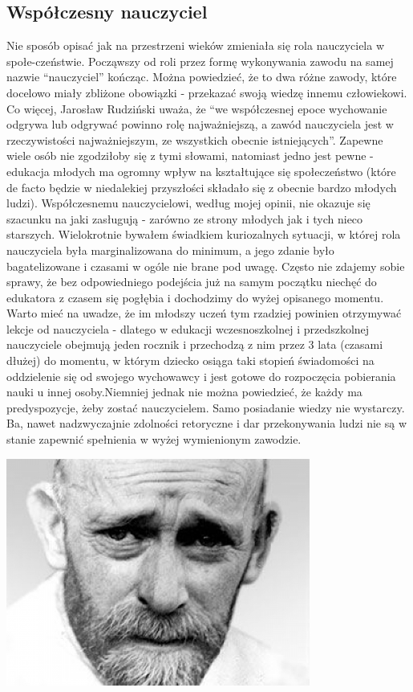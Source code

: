 \documentclass{article}
\begin{document}
\subsection{Współczesny nauczyciel}

Nie sposób opisać jak na przestrzeni wieków zmieniała się rola nauczyciela w społe-czeństwie. Począwszy od roli przez formę wykonywania zawodu na samej nazwie “nauczyciel” kończąc. Można powiedzieć, że to dwa różne zawody, które docelowo miały zbliżone obowiązki - przekazać swoją wiedzę innemu człowiekowi. Co więcej, Jarosław Rudziński uważa, że “we współczesnej epoce wychowanie odgrywa lub odgrywać powinno rolę najważniejszą, a zawód nauczyciela jest w rzeczywistości najważniejszym, ze wszystkich obecnie istniejących”. Zapewne wiele osób nie zgodziłoby się z tymi słowami, natomiast jedno jest pewne - edukacja młodych ma ogromny wpływ na kształtujące się społeczeństwo (które de facto będzie w niedalekiej przyszłości składało się z obecnie bardzo młodych ludzi). Współczesnemu nauczycielowi, według mojej opinii, nie okazuje się szacunku na jaki zasługują - zarówno ze strony młodych jak i tych nieco starszych. Wielokrotnie bywałem świadkiem kuriozalnych sytuacji, w której rola nauczyciela była marginalizowana do minimum, a jego zdanie było bagatelizowane i czasami w ogóle nie brane pod uwagę. Często nie zdajemy sobie sprawy, że bez odpowiedniego podejścia już na samym początku niechęć do edukatora z czasem się pogłębia i dochodzimy do wyżej opisanego momentu. Warto mieć na uwadze, że im młodszy uczeń tym rzadziej powinien otrzymywać lekcje od nauczyciela - dlatego w edukacji wczesnoszkolnej i przedszkolnej nauczyciele obejmują jeden rocznik i przechodzą z nim przez 3 lata (czasami dłużej) do momentu, w którym dziecko osiąga taki stopień świadomości na oddzielenie się od swojego wychowawcy i jest gotowe do rozpoczęcia pobierania nauki u innej osoby.Niemniej jednak nie można powiedzieć, że każdy ma predyspozycje, żeby zostać nauczycielem. Samo posiadanie wiedzy nie wystarczy. Ba, nawet nadzwyczajnie zdolności retoryczne i dar przekonywania ludzi nie są w stanie zapewnić spełnienia w wyżej wymienionym zawodzie. 
\begin{center}
	\includegraphics[width=10cm]{korczak}
\end{center}
\end{document}
